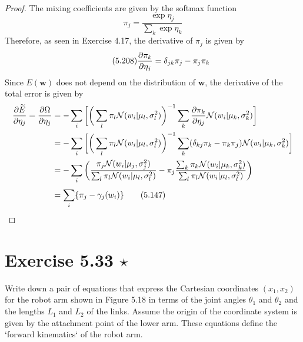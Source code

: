 \vspace{1em}

\begin{proof}
    The mixing coefficients are given by the softmax function
    \begin{equation*}
        \pi_j = \frac{\exp{\eta_j}}{\sum_{k}^{} \exp{\eta_k}}
        \tag{5.146}\label{eq:5.146}
    \end{equation*}
    Therefore, as seen in Exercise 4.17, the derivative of $\pi_j$ is 
    given by 
    \begin{equation*}\tag{5.208}
        \pdv{\pi_k}{\eta_j} = \delta_{jk} \pi_j - \pi_j \pi_k
    \end{equation*}
    Since $E(\mathbf{w})$ does not depend on the distribution of
    $\mathbf{w}$, the derivative of the total error is given by
    \begin{align*}
        \pdv{\widetilde{E}}{\eta_j}
        = \pdv{\Omega}{\eta_j}
        &= -\sum_{i}^{} \bigg[\bigg(\sum_{l}^{} \pi_l \mathcal{N}(w_i | \mu_l, \sigma_l^2)\bigg)^{-1}
        \sum_{k}^{} \pdv{\pi_k}{\eta_j} \mathcal{N}(w_i | \mu_k, \sigma_k^2)\bigg]\\ 
        &= -\sum_{i}^{} \bigg[\bigg(\sum_{l}^{} \pi_l \mathcal{N}(w_i | \mu_l, \sigma_l^2)\bigg)^{-1}
        \sum_{k}^{} (\delta_{kj} \pi_k - \pi_k \pi_j) \mathcal{N}(w_i | \mu_k, \sigma_k^2)\bigg] \\ 
        &= -\sum_{i}^{} \bigg(\frac{\pi_j \mathcal{N}(w_i | \mu_j, \sigma_j^2)}
            {\sum_{l}^{} \pi_l \mathcal{N}(w_i | \mu_l, \sigma_l^2)}
            - \pi_j \frac{\sum_{k}^{} \pi_k \mathcal{N}(w_i | \mu_k, \sigma_k^2)}
            {\sum_{l} {\pi_l \mathcal{N}(w_i | \mu_l, \sigma_l^2)}}\bigg) \\
        &= \sum_{i}^{} \{\pi_j - \gamma_j(w_i)\} \tag{5.147}\label{eq:5.147}
    \end{align*}
\end{proof}

\section*{Exercise 5.33 $\star$}
Write down a pair of equations that express the Cartesian coordinates
$(x_1, x_2)$ for the robot arm shown in Figure 5.18 in terms of the joint
angles $\theta_1$ and $\theta_2$ and the lengths $L_1$ and $L_2$ of the links.
Assume the origin of the coordinate system is given by the attachment point of
the lower arm. These equations define the `forward kinematics` of the robot arm.


